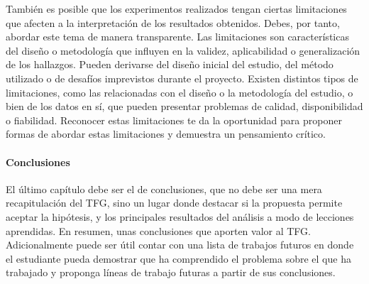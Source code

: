 También es posible que los experimentos realizados tengan ciertas limitaciones que afecten a la interpretación de los resultados obtenidos. Debes, por tanto, abordar este tema de manera transparente. Las limitaciones son características del diseño o metodología que influyen en la validez, aplicabilidad o generalización de los hallazgos. Pueden derivarse del diseño inicial del estudio, del método utilizado o de desafíos imprevistos durante el proyecto. Existen distintos tipos de limitaciones, como las relacionadas con el diseño o la metodología del estudio, o bien de los datos en sí, que pueden presentar problemas de calidad, disponibilidad o fiabilidad. Reconocer estas limitaciones te da la oportunidad para proponer formas de abordar estas limitaciones y demuestra un pensamiento crítico.

\paragraph{Conclusiones} El último capítulo debe ser el de conclusiones, que no debe ser una mera recapitulación del TFG, sino un lugar donde destacar si la propuesta permite aceptar la hipótesis, y los principales resultados del análisis a modo de lecciones aprendidas. En resumen, unas conclusiones que aporten valor al TFG. Adicionalmente puede ser útil contar con una lista de trabajos futuros en donde el estudiante pueda demostrar que ha comprendido el problema sobre el que ha trabajado y proponga líneas de trabajo futuras a partir de sus conclusiones.



